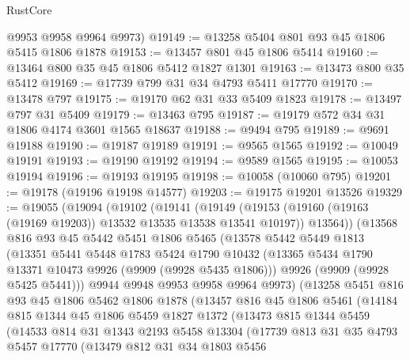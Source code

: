 \begin{lexlean}{RustCore}
\begin{coremodule}
      @9953
      @9958
      @9964
      @9973)
@19149 := @13258 @5404 @801 @93 @45 @1806 @5415 @1806 @1878
@19153 := @13457 @801 @45 @1806 @5414
@19160 := @13464 @800 @35 @45 @1806 @5412 @1827 @1301
@19163 := @13473 @800 @35 @5412
@19169 := @17739 @799 @31 @34 @4793 @5411 @17770
@19170 := @13478 @797
@19175 := @19170 @62 @31 @33 @5409 @1823
@19178 := @13497 @797 @31 @5409
@19179 := @13463 @795
@19187 := @19179 @572 @34 @31 @1806 @4174 @3601 @1565 @18637
@19188 := @9494 @795
@19189 := @9691 @19188
@19190 := @19187 @19189
@19191 := @9565 @1565
@19192 := @10049 @19191
@19193 := @19190 @19192
@19194 := @9589 @1565
@19195 := @10053 @19194
@19196 := @19193 @19195
@19198 := @10058 (@10060 @795)
@19201 := @19178 (@19196 @19198 @14577)
@19203 := @19175 @19201 @13526
@19329 := @19055
    (@19094
      (@19102
        (@19141
          (@19149
            (@19153 (@19160 (@19163 (@19169 @19203)) @13532 @13535 @13538 @13541 @10197))
            @13564))
        (@13568
          @816
          @93
          @45
          @5442
          @5451
          @1806
          @5465
          (@13578
            @5442
            @5449
            @1813
            (@13351
              @5441
              @5448
              @1783
              @5424
              @1790
              @10432
              (@13365 @5434 @1790 @13371 @10473 @9926 (@9909 (@9928 @5435 @1806)))
              @9926
              (@9909 (@9928 @5425 @5441)))
            @9944
            @9948
            @9953
            @9958
            @9964
            @9973)
          (@13258
            @5451
            @816
            @93
            @45
            @1806
            @5462
            @1806
            @1878
            (@13457
              @816
              @45
              @1806
              @5461
              (@14184
                @815
                @1344
                @45
                @1806
                @5459
                @1827
                @1372
                (@13473
                  @815
                  @1344
                  @5459
                  (@14533
                    @814
                    @31
                    @1343
                    @2193
                    @5458
                    @13304
                    (@17739
                      @813
                      @31
                      @35
                      @4793
                      @5457
                      @17770
                      (@13479
                        @812
                        @31
                        @34
                        @1803
                        @5456

\end{coremodule}
\end{lexlean}
